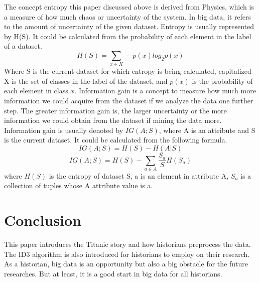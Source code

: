 \documentclass[sigconf]{acmart}
\begin{document}
\par
The concept entropy this paper discussed above is derived from 
Physics, which is a measure of how much chaos or uncertainty of the system. In big data, it refers to the amount of uncertainty of the given dataset. Entropy is usually represented by H(S). It could be calculated from the probability of each element in the label of a dataset. 
$$H(S) = \sum_{ x \in X } -p(x)log_2p(x)$$
Where S is the current dataset for which entropy is being calculated, capitalized X is the set of classes in the label of the dataset, and $p(x)$ is the probability of each element in class $x$. 
Information gain is a concept to measure how much more information we could acquire from the dataset if we analyze the data one further step. The greater information gain is, the larger uncertainty or the more information we could obtain from the dataset if mining the data more. Information gain is usually denoted by $IG(A;S)$, where A is an attribute and S is the current dataset. It could be calculated from the following formula.
$$IG(A;S)= H(S) - H(A|S)$$
$$IG(A;S)= H(S) - \sum_{a \in A}\frac{S_a}{S} H(S_a)$$
where $H(S)$ is the entropy of dataset S, a is an element in attribute A, $S_a$ is a collection of tuples whose A attribute value is a. 

\section{Conclusion}
This paper introduces the Titanic story and how historians preprocess the data. The ID3 algorithm is also introduced for historians to employ on their research. As a historian, big data is an opportunity but also a big obstacle for the future researches. But at least, it is a good start in big data for all historians.


 
\end{document}
